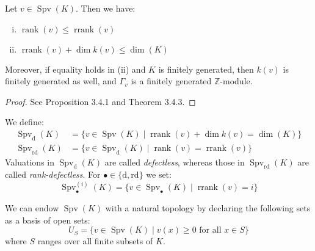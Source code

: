 \begin{lemma}\label{rank-dimension-inequality}
Let $v\in\operatorname{Spv}(K)$. Then we have:
\begin{enumerate}[(i)]
\item $\operatorname{rank}(v)\leq \operatorname{rrank}(v)$
\item $\operatorname{rrank}(v)+\dim k(v)\leq\dim(K)$
\end{enumerate}
Moreover, if equality holds in (ii) and $K$ is finitely generated, then $k(v)$ is finitely generated as well, and $\Gamma_v$ is a finitely generated $\mathbb{Z}$-module.
\end{lemma}

\begin{proof}
See \cite{EP05} Proposition 3.4.1 and Theorem 3.4.3.
\end{proof}

\begin{definition}
We define:
\begin{align*}
\operatorname{Spv}_\text{d}(K) &= \{v\in\operatorname{Spv}(K)\mid \operatorname{rrank}(v)+\dim k(v)=\dim(K) \} \\
\operatorname{Spv}_\text{rd}(K) &= \{v\in\operatorname{Spv}_\text{d}(K)\mid \operatorname{rank}(v)=\operatorname{rrank}(v) \}
\end{align*}
Valuations in $\operatorname{Spv}_\text{d}(K)$ are called \textit{defectless}, whereas those in $\operatorname{Spv}_\text{rd}(K)$ are called \textit{rank-defectless}. For $\bullet\in\{\text{d},\text{rd}\}$ we set:
\[\operatorname{Spv}_\bullet^{(i)}(K)=\{v\in\operatorname{Spv}_\bullet(K)\mid \operatorname{rrank}(v)=i \} \]
\end{definition}

\begin{definition}
We can endow $\operatorname{Spv}(K)$ with a natural topology by declaring the following sets as a basis of open sets:
\[U_S =\{v\in\operatorname{Spv}(K)\mid v(x)\geq 0\text{ for all }x\in S\} \]
where $S$ ranges over all finite subsets of $K$. 
\end{definition}

